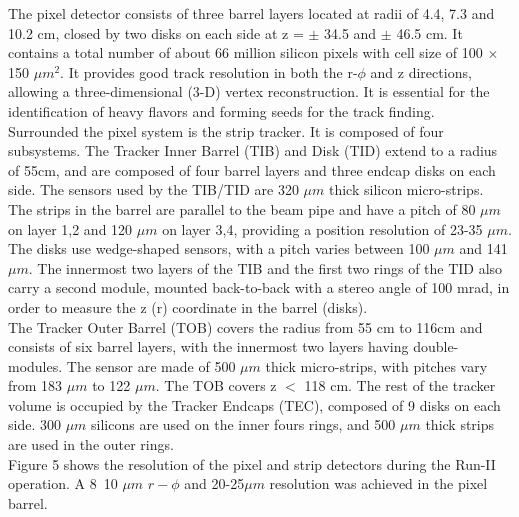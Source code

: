 \documentclass[thesis.tex]{subfiles}
\begin{document}
The pixel detector consists of three barrel layers located at radii of 4.4, 7.3 and 10.2 cm, closed by two disks on each side at z = $\pm$ 34.5 and $\pm$ 46.5 cm. 
It contains a total number of about 66 million silicon pixels with cell size of 100 $\times$150 $\mu m^2$. 
It provides good track resolution in both the r-$\phi$ and z directions, allowing a three-dimensional (3-D) vertex reconstruction. 
It is essential for the identification of heavy flavors and forming seeds for the track finding. \\

Surrounded the pixel system is the strip tracker. 
It is composed of four subsystems. 
The Tracker Inner Barrel (TIB) and Disk (TID) extend to a radius of 55cm, and are composed of four barrel layers and three endcap disks on each side. 
The sensors used by the TIB/TID are 320 $\mu m$ thick silicon micro-strips. 
The strips in the barrel are parallel to the beam pipe and have a pitch of 80 $\mu m$ on layer 1,2 and 120 $\mu m$ on layer 3,4, providing a position resolution of 23-35 $\mu m$. 
The disks use wedge-shaped sensors, with a pitch varies between 100 $\mu m$ and 141 $\mu m$. 
The innermost two layers of the TIB and the first two rings of the TID also carry a second module, mounted back-to-back with a stereo angle of 100 mrad, in order to measure the z (r) coordinate in the barrel (disks). \\

The Tracker Outer Barrel (TOB) covers the radius from 55 cm to 116cm and consists of six barrel layers, with the innermost two layers having double-modules. 
The sensor are made of 500 $\mu m$ thick micro-strips, with pitches vary from 183 $\mu m$ to 122 $\mu m$. 
The TOB covers z $<$ 118 cm. The rest of the tracker volume is occupied by the Tracker Endcaps (TEC), composed of 9 disks on each side. 
300 $\mu m$ silicons are used on the inner fours rings, and 500 $\mu m$ thick strips are used in the outer rings. \\


Figure 5 shows the resolution of the pixel and strip detectors during the Run-II operation. A 8~10 $\mu m$ $r-\phi$ and 20-25$\mu m$ resolution was achieved in the pixel barrel. 
\end{document}
